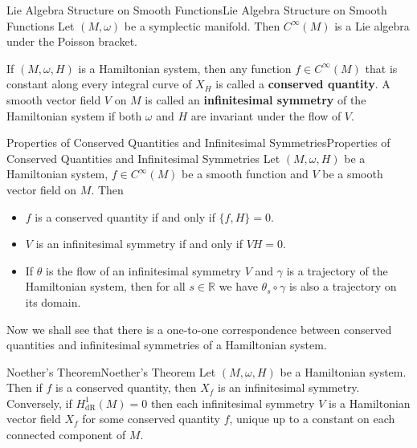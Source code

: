 \documentclass[../main.tex]{subfiles}
\begin{document}
\begin{corollary}{Lie Algebra Structure on Smooth Functions}{Lie Algebra Structure on Smooth Functions}
  Let $(M, \omega)$ be a symplectic manifold. Then $C^\infty(M)$ is a Lie algebra under the Poisson bracket.
\end{corollary}

If $(M, \omega, H)$ is a Hamiltonian system, then any function $f \in C^\infty(M)$ that is constant along every integral curve of $X_H$ is called a \textbf{conserved quantity}. A smooth vector field $V$ on $M$ is called an \textbf{infinitesimal symmetry} of the Hamiltonian system if both $\omega$ and $H$ are invariant under the flow of $V$.

\begin{proposition}{Properties of Conserved Quantities and Infinitesimal Symmetries}{Properties of Conserved Quantities and Infinitesimal Symmetries}
  Let $(M, \omega, H)$ be a Hamiltonian system, $f \in C^\infty(M)$ be a smooth function and $V$ be a smooth vector field on $M$. Then
  \begin{itemize}
    \item $f$ is a conserved quantity if and only if $\{f, H\} = 0$.
    \item $V$ is an infinitesimal symmetry if and only if $VH = 0$.
    \item If $\theta$ is the flow of an infinitesimal symmetry $V$ and $\gamma$ is a trajectory of the Hamiltonian system, then for all $s\in \mathbb{R}$ we have $\theta_s \circ \gamma$ is also a trajectory on its domain.
  \end{itemize}
\end{proposition}

Now we shall see that there is a one-to-one correspondence between conserved quantities and infinitesimal symmetries of a Hamiltonian system.

\begin{theorem}{Noether's Theorem}{Noether's Theorem}
  Let $(M, \omega, H)$ be a Hamiltonian system. Then if $f$ is a conserved quantity, then $X_f$ is an infinitesimal symmetry. Conversely, if $H_{\mathrm{dR}}^1(M) = 0$ then each infinitesimal symmetry $V$ is a Hamiltonian vector field $X_f$ for some conserved quantity $f$, unique up to a constant on each connected component of $M$.
\end{theorem}
\end{document}
